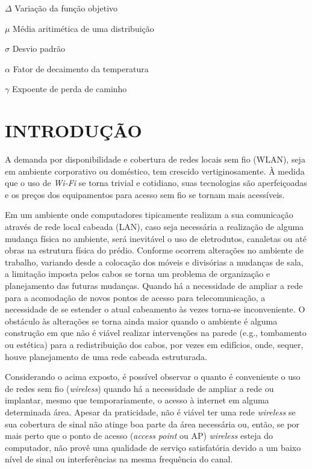 \documentclass[
	12pt,				%
	twoside,			%
	a4paper,			%
	english,			%
	french,				%
	spanish,			%
	brazil				%
	]{abntex2}
\begin{document}
\begin{simbolos}
  \item[$ \Delta $] Variação da função objetivo
  \item[$ \mu $] Média aritimética de uma distribuição
  \item[$ \sigma $] Desvio padrão
  \item[$ \alpha $] Fator de decaimento da temperatura
  \item[$ \gamma $] Expoente de perda de caminho
\end{simbolos}
\tableofcontents*
\cleardoublepage


\textual

\chapter{INTRODUÇÃO}\label{introduuxe7uxe3o}

A demanda por disponibilidade e cobertura de redes locais sem fio
(WLAN), seja em ambiente corporativo ou doméstico, tem crescido
vertiginosamente. À medida que o uso de \emph{Wi-Fi} se torna trivial e
cotidiano, suas tecnologias são aperfeiçoadas e os preços dos
equipamentos para acesso sem fio se tornam mais
acessíveis\cite{MARQUES}.

Em um ambiente onde computadores tipicamente realizam a sua comunicação
através de rede local cabeada (LAN), caso seja necessária a realização
de alguma mudança física no ambiente, será inevitável o uso de
eletrodutos, canaletas ou até obras na estrutura física do prédio.
Conforme ocorrem alterações no ambiente de trabalho, variando desde a
colocação dos móveis e divisórias a mudanças de sala, a limitação
imposta pelos cabos se torna um problema de organização e planejamento
das futuras mudanças. Quando há a necessidade de ampliar a rede para a
acomodação de novos pontos de acesso para telecomunicação, a necessidade
de se estender o atual cabeamento às vezes torna-se inconveniente. O
obstáculo às alterações se torna ainda maior quando o ambiente é alguma
construção em que não é viável realizar intervenções na parede (e.g.,
tombamento ou estética) para a redistribuição dos cabos, por vezes em
edifícios, onde, sequer, houve planejamento de uma rede cabeada
estruturada.

Considerando o acima exposto, é possível observar o quanto é conveniente
o uso de redes sem fio (\emph{wireless}) quando há a necessidade de
ampliar a rede ou implantar, mesmo que temporariamente, o acesso à
internet em alguma determinada área. Apesar da praticidade, não é viável
ter uma rede \emph{wireless} se sua cobertura de sinal não atinge boa
parte da área necessária ou, então, se por mais perto que o ponto de
acesso (\emph{access point} ou AP) \emph{wireless} esteja do computador,
não provê uma qualidade de serviço satisfatória devido a um baixo nível
de sinal ou interferências na mesma frequência do canal.
\end{document}
